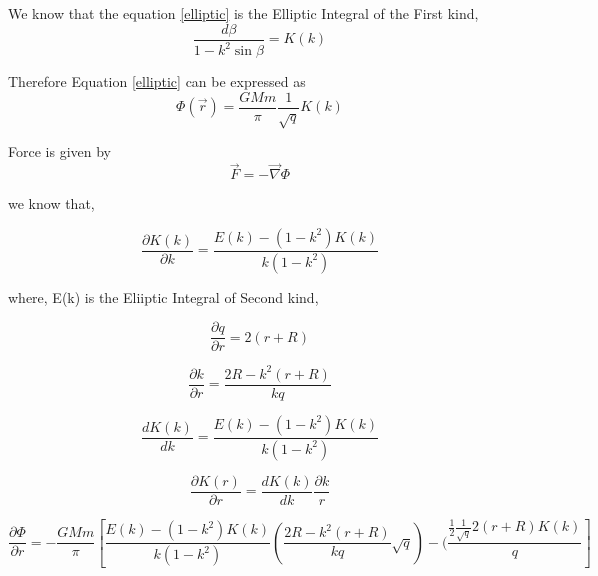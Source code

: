 \begin{center}
We know that the equation \eqref{elliptic} is the Elliptic Integral of the First kind,
\begin{equation}
\frac{d \beta } {1 - k^2 \sin \beta } = K (k) 
\end{equation}
 
Therefore Equation \eqref{elliptic} can be expressed as
\begin{equation}
 \Phi (\vec{r}) = \frac{GMm}{ \pi} \frac{1}{\sqrt{q}} K (k) 
\end{equation}

Force is given by
\begin{equation}
   \vec{F} = - \vec{\nabla} \Phi 
\end{equation}
\end{center}

we know that,
\begin{center}

\begin{equation}
\frac{\partial K (k)}{\partial k } = \frac{E(k)- (1-k^2) K(k)}{k(1- k^2)} 
\end{equation}
\end{center}
where, E(k) is the Eliiptic Integral of Second kind,

\begin{center}

\begin{equation}
 \frac{\partial q}{\partial r} = 2 (r + R)
\end{equation}

\begin{equation}
 \frac{\partial k}{\partial r} = \frac{2R - k^2 (r + R)}{kq} 
\end{equation}

\begin{equation}
\frac{d K(k)}{d k} = \frac{E(k) - (1-k^2) K(k)}{k (1-k^2)} 
\end{equation}

\begin{equation}
\frac{\partial K (r)}{\partial r} = \frac{d K(k)}{dk} \frac{\partial k }{r} 
\end{equation}

\begin{equation}
\frac{\partial \Phi}{\partial r} = - \frac{GMm }{\pi} [ \frac{E(k) - (1-k^2) K(k)}{k (1-k^2)} (\frac{2R - k^2 (r + R)}{kq} \sqrt{q}) - (\frac{\frac{1}{2} \frac{1}{\sqrt{q}}2 (r + R ) K(k)} {q}] 
\end{equation}

\end{center}

